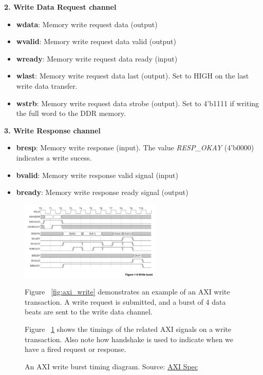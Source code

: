 \documentclass[11pt]{article}
\begin{document}
\textbf{2. Write Data Request channel}
\begin{itemize}
\item \textbf{wdata}: Memory write request data (output)
\item \textbf{wvalid}: Memory write request data valid (output)
\item \textbf{wready}: Memory write request data ready (input)
\item \textbf{wlast}: Memory write request data last (output). Set to HIGH on the last write data transfer.
\item \textbf{wstrb}: Memory write request data strobe (output). Set to 4'b1111 if writing the full word to the DDR memory.
\end{itemize}

\textbf{3. Write Response channel}
\begin{itemize}
\item \textbf{bresp}: Memory write response (input). The value \textit{RESP\_OKAY} (4'b0000) indicates a write sucess.
\item \textbf{bvalid}: Memory write response valid signal (input)
\item \textbf{bready}: Memory write response ready signal (output)
\end{itemize}

\begin{figure}[hbt]
\begin{center}
  \includegraphics[width=0.6\textwidth]{axi_write_burst.png}
  \caption{An AXI write burst timing diagram. Source: \href{https://developer.arm.com/documentation/ihi0022/b}{AXI Spec}}
  \label{fig:axi_write_burst}
\end{center}

Figure ~\ref{fig:axi_write} demonstrates an example of an AXI write transaction.
A write request is submitted, and a burst of 4 data beats are sent to the write data channel.

Figure ~\ref{fig:axi_write_burst} shows the timings of the related AXI signals on a write transaction. Also note how handshake is used to indicate when we have a fired request or response.

\end{figure}
\end{document}
